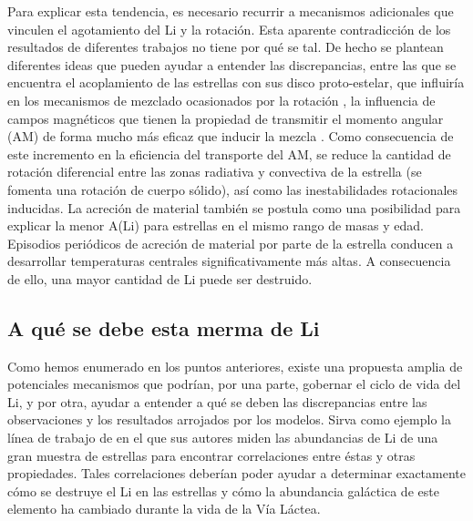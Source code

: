Para explicar esta tendencia, es necesario recurrir a mecanismos adicionales que vinculen el agotamiento del Li y la rotación. Esta aparente contradicción de los resultados de diferentes trabajos no tiene por qué se tal. De hecho se plantean diferentes ideas que pueden ayudar a entender las discrepancias, entre las que se encuentra el acoplamiento de las estrellas con sus disco proto-estelar, que influiría en los mecanismos de mezclado ocasionados por la rotación \cite{Bouvier2008, Eggenberger2012}, la influencia de campos magnéticos \cite{Eggenberger2009} que tienen la propiedad de transmitir el momento angular (AM) de forma mucho más eficaz que inducir la mezcla \cite{Denissenkov2007}. Como consecuencia de este incremento en la eficiencia del transporte del AM, se reduce la cantidad de rotación diferencial entre las zonas radiativa y convectiva de la estrella (se fomenta una rotación de cuerpo sólido), así como las inestabilidades rotacionales inducidas. La acreción de material \cite{Baraffe2010} también se postula como una posibilidad para explicar la menor A(Li) para estrellas en el mismo rango de masas y edad. Episodios periódicos de acreción de material por parte de la estrella conducen a desarrollar temperaturas centrales significativamente más altas. A consecuencia de ello, una mayor cantidad de Li puede ser destruido.\par


\subsection{A qué se debe esta merma de Li}
Como hemos enumerado en los puntos anteriores, existe una propuesta amplia de potenciales mecanismos que podrían, por una parte, gobernar el ciclo de vida del Li, y por otra, ayudar a entender a qué se deben las discrepancias entre las observaciones y los resultados arrojados por los modelos. Sirva como ejemplo la línea de trabajo de \cite{Ramirez2012} en el que sus autores miden las abundancias de Li de una gran muestra de estrellas para encontrar correlaciones entre éstas y otras propiedades. Tales correlaciones deberían poder ayudar a determinar exactamente cómo se destruye el Li en las estrellas y cómo la abundancia galáctica de este elemento ha cambiado durante la vida de la Vía Láctea.\par 

